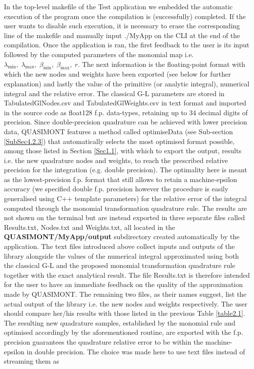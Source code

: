 \documentclass[a4paper, twosided]{book}
\begin{document}
\noindent
In the top-level \colorbox{poliGrayBlue}{makefile} of the \colorbox{poliGrayBlue}{Test} application we embedded the automatic execution of the program once the compilation is (successfully) completed. If the user wants to disable such execution, it is necessary to erase the corresponding line of the \colorbox{poliGrayBlue}{makefile} and manually input \colorbox{poliGrayBlue}{./MyApp} on the CLI at the end of the compilation. Once the application is ran, the first feedback to the user is its input followed by the computed parameters of the monomial map i.e. $\lambda_{\text{min}},\;\lambda_{\text{max}},\;\beta_{\text{min}},\;\beta_{\text{max}},\;r$. The next information is the floating-point format with which the new nodes and weights have been exported (see below for further explanation) and lastly the value of the primitive (or analytic integral), numerical integral and the relative error. The classical G-L parameters are stored in \colorbox{poliGrayBlue}{TabulatedGlNodes.csv} and \colorbox{poliGrayBlue}{TabulatedGlWeights.csv} in text format and imported in the source code as \colorbox{poliGrayBlue}{float128} f.p. data-types, retaining up to 34 decimal digits of precision. Since double-precision quadrature can be achieved with lower precision data, QUASIMONT features a method called \colorbox{poliGrayBlue}{optimiseData} (see Sub-section \ref{SubSec4.2.3}) that automatically selects the most optimised format possible, among those listed in Section \ref{Sec1.1}, with which to export the output, results i.e. the new quadrature nodes and weights, to reach the prescribed relative precision for the integration (e.g. double precision). The optimality here is meant as the lowest-precision f.p. format that still allows to retain a machine-epsilon accuracy (we specified double f.p. precision however the procedure is easily generalised using C++ template parameters) for the relative error of the integral computed through the monomial  transformation quadrature rule. The results are not shown on the terminal but are instead exported in three separate files called \colorbox{poliGrayBlue}{Results.txt}, \colorbox{poliGrayBlue}{Nodes.txt} and \colorbox{poliGrayBlue}{Weights.txt}, all located in the \colorbox{poliGrayBlue}{\textbf{QUASIMONT/MyApp/output}} subdirectory created automatically by the application. The text files introduced above collect inputs and outputs of the library alongside the values of the numerical integral approximated using both the classical G-L and the proposed monomial transformation quadrature rule together with the exact analytical result. The file \colorbox{poliGrayBlue}{Results.txt} is therefore intended for the user to have an immediate feedback on the quality of the approximation made by QUASIMONT. The remaining two files, as their names suggest, list the actual output of the library i.e. the new nodes and weights respectively. The user should compare her/his results with those listed in the previous Table \ref{table2.1}. The resulting new quadrature samples, established by the monomial rule and optimised accordingly by the aforementioned routine, are exported with the f.p. precision guarantees the quadrature relative error to be within the machine-epsilon in double precision. The choice was made here to use text files instead of streaming them as 
\end{document}

